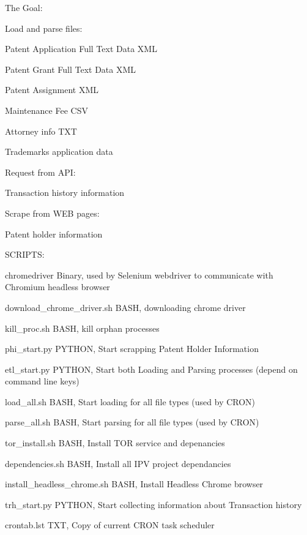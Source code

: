 The Goal\+:

Load and parse files\+:
\begin{DoxyItemize}
\item Patent Application Full Text Data XML
\item Patent Grant Full Text Data XML
\item Patent Assignment XML
\item Maintenance Fee CSV
\item Attorney info TXT
\item Trademarks application data
\end{DoxyItemize}

Request from API\+:
\begin{DoxyItemize}
\item Transaction history information
\end{DoxyItemize}

Scrape from WEB pages\+:
\begin{DoxyItemize}
\item Patent holder information
\end{DoxyItemize}

SCRIPTS\+:
\begin{DoxyItemize}
\item chromedriver Binary, used by Selenium webdriver to communicate with Chromium headless browser
\item download\+\_\+chrome\+\_\+driver.\+sh BASH, downloading chrome driver
\item kill\+\_\+proc.\+sh BASH, kill orphan processes
\item phi\+\_\+start.\+py PYTHON, Start scrapping Patent Holder Information
\item etl\+\_\+start.\+py PYTHON, Start both Loading and Parsing processes (depend on command line keys)
\item load\+\_\+all.\+sh BASH, Start loading for all file types (used by CRON)
\item parse\+\_\+all.\+sh BASH, Start parsing for all file types (used by CRON)
\item tor\+\_\+install.\+sh BASH, Install TOR service and depenancies
\item dependencies.\+sh BASH, Install all IPV project dependancies
\item install\+\_\+headless\+\_\+chrome.\+sh BASH, Install Headless Chrome browser
\item trh\+\_\+start.\+py PYTHON, Start collecting information about Transaction history
\item crontab.\+lst TXT, Copy of current CRON task scheduler
\end{DoxyItemize}


